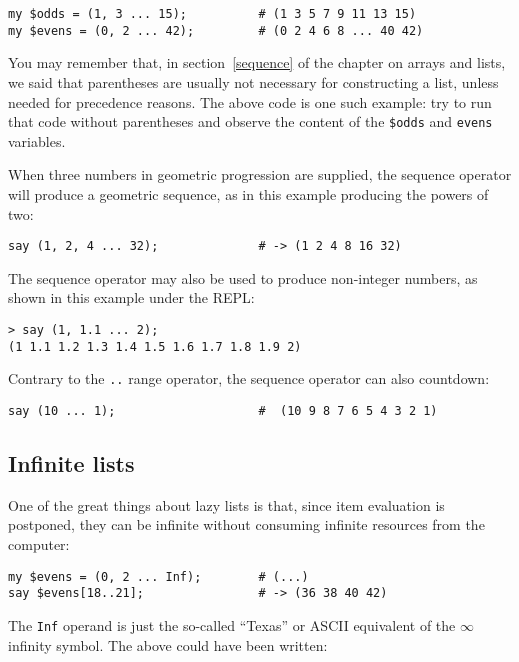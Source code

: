 \begin{verbatim}
my $odds = (1, 3 ... 15);          # (1 3 5 7 9 11 13 15)
my $evens = (0, 2 ... 42);         # (0 2 4 6 8 ... 40 42)
\end{verbatim}

You may remember that, in section~\ref{sequence} of the chapter 
on arrays and lists, we said that parentheses are usually not 
necessary for constructing a list, unless needed for 
precedence reasons. The above code is one such example: try 
to run that code without parentheses and observe the content 
of the \verb'$odds' and \verb'evens' variables.

When three numbers in geometric progression are supplied, the 
sequence operator will produce a geometric sequence, as in 
this example producing the powers of two:

\begin{verbatim}
say (1, 2, 4 ... 32);              # -> (1 2 4 8 16 32)
\end{verbatim}

The sequence operator may also be used to produce non-integer 
numbers, as shown in this example under the REPL:

\begin{verbatim}
> say (1, 1.1 ... 2);
(1 1.1 1.2 1.3 1.4 1.5 1.6 1.7 1.8 1.9 2)
\end{verbatim}

Contrary to the \verb'..' range operator, the sequence 
operator can also countdown:

\begin{verbatim}
say (10 ... 1);                    #  (10 9 8 7 6 5 4 3 2 1)
\end{verbatim}

\subsection{Infinite lists}

One of the great things about lazy lists is that, since 
item evaluation is postponed, they can be infinite without 
consuming infinite resources from the computer:

\begin{verbatim}
my $evens = (0, 2 ... Inf);        # (...)
say $evens[18..21];                # -> (36 38 40 42)
\end{verbatim}

The {\tt Inf} operand is just the so-called ``Texas'' 
or ASCII equivalent of the $\infty$ infinity symbol. 
The above could have been written:

